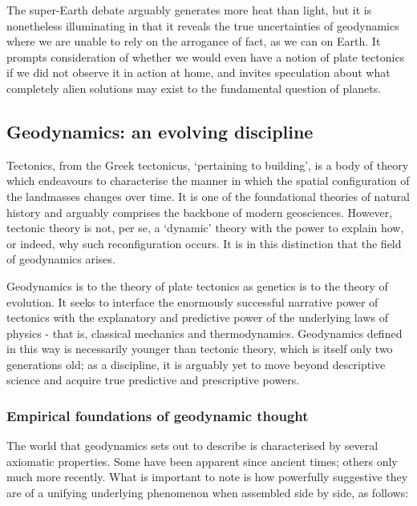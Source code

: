 \documentclass[a4paper,11pt,oneside]{book}
\begin{document}
The super-Earth debate arguably generates more heat than light, but it is nonetheless illuminating in that it reveals the true uncertainties of geodynamics where we are unable to rely on the arrogance of fact, as we can on Earth. It prompts consideration of whether we would even have a notion of plate tectonics if we did not observe it in action at home, and invites speculation about what completely alien solutions may exist to the fundamental question of planets.

\subsection{Geodynamics: an evolving discipline}

Tectonics, from the Greek tectonicus, `pertaining to building', is a body of theory which endeavours to characterise the manner in which the spatial configuration of the landmasses changes over time. It is one of the foundational theories of natural history and arguably comprises the backbone of modern geosciences. However, tectonic theory is not, per se, a `dynamic' theory with the power to explain how, or indeed, why such reconfiguration occurs. It is in this distinction that the field of geodynamics arises.

Geodynamics is to the theory of plate tectonics as genetics is to the theory of evolution. It seeks to interface the enormously successful narrative power of tectonics with the explanatory and predictive power of the underlying laws of physics - that is, classical mechanics and thermodynamics. Geodynamics defined in this way is necessarily younger than tectonic theory, which is itself only two generations old; as a discipline, it is arguably yet to move beyond descriptive science and acquire true predictive and prescriptive powers.

\subsubsection{Empirical foundations of geodynamic thought}

The world that geodynamics sets out to describe is characterised by several axiomatic properties. Some have been apparent since ancient times; others only much more recently. What is important to note is how powerfully suggestive they are of a unifying underlying phenomenon when assembled side by side, as follows:
\end{document}
